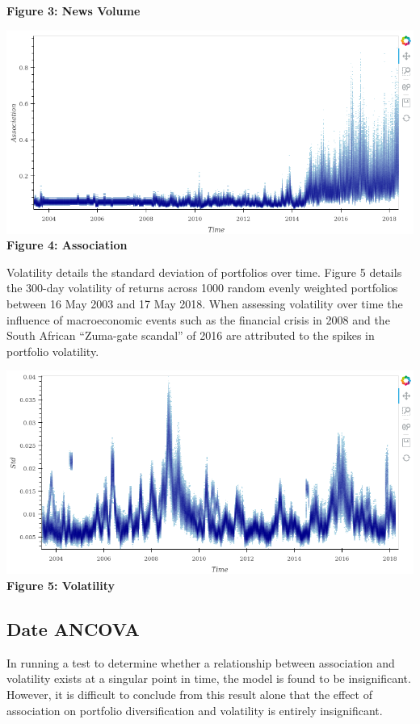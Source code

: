 \documentclass[11pt]{article}
\makeatletter
\def\maxwidth{\ifdim\Gin@nat@width>\linewidth\linewidth
    \else\Gin@nat@width\fi}
\let\Oldincludegraphics\includegraphics
\renewcommand{\includegraphics}[1]{\Oldincludegraphics[width=.8\maxwidth]{#1}}
\makeatother
\begin{document}
\textbf{Figure 3: News Volume}

\includegraphics{../experiments/media/Association Over Time.png}\\

\textbf{Figure 4: Association}

Volatility details the standard deviation of portfolios over time.
Figure 5 details the 300-day volatility of returns across 1000 random
evenly weighted portfolios between 16 May 2003 and 17 May 2018. When
assessing volatility over time the influence of macroeconomic events
such as the financial crisis in 2008 and the South African ``Zuma-gate
scandal'' of 2016 are attributed to the spikes in portfolio volatility.

\includegraphics{../experiments/media/Volatility Over Time time.png}\\

\textbf{Figure 5: Volatility}

\hypertarget{date-ancova}{%
\subsection{Date ANCOVA}\label{date-ancova}}

In running a test to determine whether a relationship between
association and volatility exists at a singular point in time, the model
is found to be insignificant. However, it is difficult to conclude from
this result alone that the effect of association on portfolio
diversification and volatility is entirely insignificant.
\end{document}
